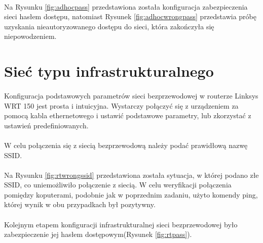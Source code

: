 \documentclass[wide,a4paper,titlepage,12pt] {article}
\begin{document}

\paragraph{} %
\label{par:}
Na Rysunku \ref{fig:adhocpass} przedstawiona została konfiguracja zabezpieczenia sieci hasłem dostępu, natomiast Rysunek \ref{fig:adhocwrongpass} przedstawia próbę uzyskania nieautoryzowanego dostępu do sieci, która zakończyła się niepowodzeniem.

\section{Sieć typu infrastrukturalnego} %
\paragraph{} %
Konfiguracja podstawowych parametrów sieci bezprzewodowej w routerze Linksys WRT 150 jest prosta i intuicyjna. Wystarczy połączyć się z urządzeniem za pomocą kabla ethernetowego i ustawić podstawowe parametry, lub zkorzystać z ustawień predefiniowanych.

\paragraph{}
W celu połączenia się z siecią bezprzewodową należy podać prawidłową nazwę SSID.


\paragraph{} %
\label{par:}
Na Rysunku \ref{fig:rtwrongssid} przedstawiona została sytuacja, w której podano złe SSID, co uniemożliwiło połączenie z siecią. W celu weryfikacji połączenia pomiędzy koputerami, podobnie jak w poprzednim zadaniu, użyto komendy ping, której wynik w obu przypadkach był pozytywny.

\paragraph{} %
\label{par:}
Kolejnym etapem konfiguracji infrastrukturalnej sieci bezprzewodowej było zabezpieczenie jej hasłem dostępowym(Rysunek \ref{fig:rtpass}).
\end{document}
